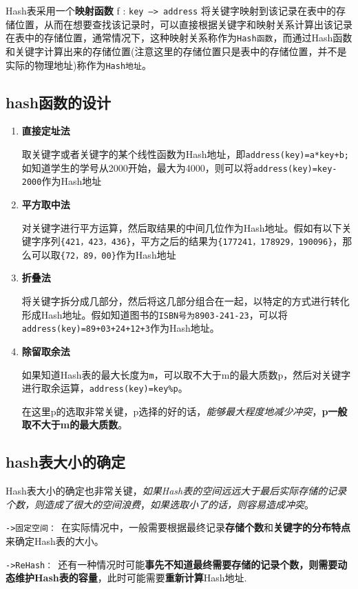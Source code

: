\documentclass[UTF8,a4paper,12pt]{ctexbook}
\begin{document}
	Hash表采用一个\textbf{映射函数} f : \verb|key —> address| 将关键字映射到该记录在表中的存储位置，从而在想要查找该记录时，可以直接根据关键字和映射关系计算出该记录在表中的存储位置，通常情况下，这种映射关系称作为\verb|Hash函数|，而通过Hash函数和关键字计算出来的存储位置(注意这里的存储位置只是表中的存储位置，并不是实际的物理地址)称作为\verb|Hash地址|。
	

	\subsection{hash函数的设计}
		\begin{enumerate}
			\item \textbf{直接定址法}
			
				取关键字或者关键字的某个线性函数为Hash地址，即\verb|address(key)=a*key+b;|如知道学生的学号从2000开始，最大为4000，则可以将\verb|address(key)=key-2000|作为Hash地址
			\item \textbf{平方取中法}
			
				对关键字进行平方运算，然后取结果的中间几位作为Hash地址。假如有以下关键字序列\verb|{421，423，436}|，平方之后的结果为\verb|{177241，178929，190096}|，那么可以取\verb|{72，89，00}|作为Hash地址
			\item \textbf{折叠法}
			
				将关键字拆分成几部分，然后将这几部分组合在一起，以特定的方式进行转化形成Hash地址。假如知道图书的\verb|ISBN号为8903-241-23|，可以将\verb|address(key)=89+03+24+12+3|作为Hash地址。
			\item \textbf{除留取余法}
				
				如果知道Hash表的最大长度为\verb|m|，可以取不大于m的最大质数p，然后对关键字进行取余运算，\verb|address(key)=key%p|。
				
				在这里p的选取非常关键，p选择的好的话，\textit{能够最大程度地减少冲突}，\textbf{p一般取不大于m的最大质数}。
		\end{enumerate}
	\subsection{hash表大小的确定}
		Hash表大小的确定也非常关键，\textit{如果Hash表的空间远远大于最后实际存储的记录个数，则造成了很大的空间浪费}，\textit{如果选取小了的话，则容易造成冲突}。
		
		\verb|->固定空间： |在实际情况中，一般需要根据最终记录\textbf{存储个数}和\textbf{关键字的分布特点}来确定Hash表的大小。
		
		\verb|->ReHash： |还有一种情况时可能\textbf{事先不知道最终需要存储的记录个数，则需要动态维护Hash表的容量}，此时可能需要\textbf{重新计算}Hash地址.
		
\end{document}
